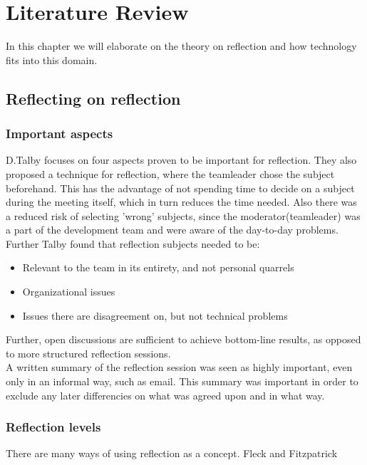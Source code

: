 \section{Literature Review}
In this chapter we will elaborate on the theory on reflection and how technology fits into this domain. 

\subsection{Reflecting on reflection}
\subsubsection*{Important aspects}
D.Talby \cite{Talby2006} focuses on four aspects proven to be important for reflection. They also proposed a technique for reflection, where the teamleader chose the subject beforehand. This has the advantage of not spending time to decide on a subject during the meeting itself, which in turn reduces the time needed. Also there was a reduced risk of selecting 'wrong' subjects, since the moderator(teamleader) was a part of the development team and were aware of the day-to-day problems.\\
Further Talby found that reflection subjects needed to be:
\begin{itemize}
\item Relevant to the team in its entirety, and not personal quarrels
\item Organizational issues
\item Issues there are disagreement on, but not technical problems
\end{itemize}
Further, open discussions are sufficient to achieve bottom-line results, as opposed to more structured reflection sessions.\\
A written summary of the reflection session was seen as highly important, even only in an informal way, such as email. This summary was important in order to exclude any later differencies on what was agreed upon and in what way.
\subsubsection*{Reflection levels}
There are many ways of using reflection as a concept. Fleck and Fitzpatrick 


